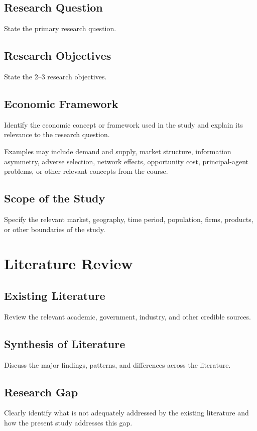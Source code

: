 \documentclass[12pt,a4paper]{article}
\begin{document}
\subsection{Research Question}
State the primary research question.

\subsection{Research Objectives}
State the 2--3 research objectives.

\subsection{Economic Framework}
Identify the economic concept or framework used in the study and explain its relevance to the research question.

Examples may include demand and supply, market structure, information asymmetry, adverse selection, network effects, opportunity cost, principal-agent problems, or other relevant concepts from the course.

\subsection{Scope of the Study}
Specify the relevant market, geography, time period, population, firms, products, or other boundaries of the study.

\section{Literature Review}
\subsection{Existing Literature}
Review the relevant academic, government, industry, and other credible sources.

\subsection{Synthesis of Literature}
Discuss the major findings, patterns, and differences across the literature.

\subsection{Research Gap}
Clearly identify what is not adequately addressed by the existing literature and how the present study addresses this gap.
\end{document}

